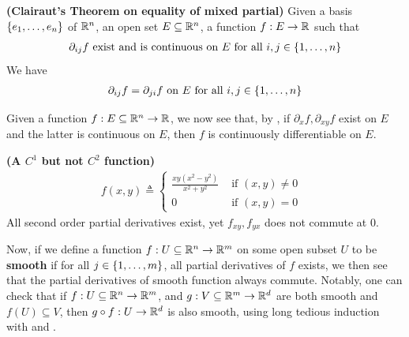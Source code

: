 \documentclass{report}
\begin{document}
\begin{corollary}
\textbf{(Clairaut's Theorem on equality of mixed partial)} Given a basis $\{ e_1,\dots ,e_n \}$ of $\mathbb{R}^n$, an open set $E\subseteq \mathbb{R}^n$, a function $f:E\rightarrow \mathbb{R}$ such that 
\begin{align*}
\partial_{ij}f\text{ exist and is continuous on }E\text{ for all }i,j \in \{ 1,\dots ,n \}
\end{align*}
We have  
\begin{align*}
\partial_{ij}f=\partial_{ji}f\text{ on $E$ for all }i,j\in \{ 1,\dots ,n \}
\end{align*}
\end{corollary}
\begin{mdframed}
Given a function $f:E\subseteq \mathbb{R}^n\rightarrow \mathbb{R}$, we now see that, by , if $\partial_x f,\partial_{xy}f$ exist on $E$ and the latter is continuous on $E$, then  $f$ is continuously differentiable on $E$.    
\end{mdframed}
\begin{Example}{\textbf{(A $C^1$ but not $C^2$ function)}}{}
\begin{align*}
  f(x,y)\triangleq \begin{cases}
   \frac{xy(x^2-y^2)}{x^2+y^2}& \text{ if $(x,y)\neq 0$ }\\
   0& \text{ if $(x,y)=0$ }
  \end{cases}
\end{align*}
All second order partial derivatives exist, yet $f_{xy},f_{yx}$ does not commute at $0$. 
\end{Example}
\begin{mdframed}
Now, if we define a function $f:U\subseteq \mathbb{R}^n\rightarrow \mathbb{R}^m$ on some open subset $U$ to be \textbf{smooth} if for all $j\in \{ 1,\dots ,m \}$, all partial derivatives of $f$ exists, we then see that the partial derivatives of smooth function always commute. Notably, one can check that if $f:U\subseteq \mathbb{R}^n\rightarrow \mathbb{R}^m$, and $g:V\subseteq \mathbb{R}^m\rightarrow \mathbb{R}^d$ are both smooth and $f(U)\subseteq V$, then $g\circ f:U\rightarrow \mathbb{R}^d$ is also smooth, using long tedious induction with  and . 
\end{mdframed}
\end{document}
